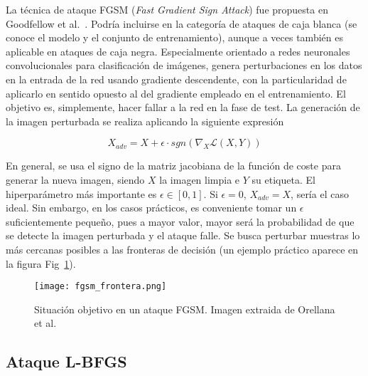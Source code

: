 La técnica de ataque FGSM (\textit{Fast Gradient Sign Attack}) fue propuesta en Goodfellow et al.~\cite{GoodfLAdvers}. Podría incluirse en la categoría de ataques de caja blanca (se conoce el modelo y el conjunto de entrenamiento), aunque a veces también es aplicable en ataques de caja negra. Especialmente orientado a redes neuronales convolucionales para clasificación de imágenes, genera perturbaciones en los datos en la entrada de la red usando gradiente descendente, con la particularidad de aplicarlo en sentido opuesto al del gradiente empleado en el entrenamiento. El objetivo es, simplemente, hacer fallar a la red en la fase de test. La generación de la imagen perturbada se realiza aplicando la siguiente expresión

$$X_{adv} = X + \epsilon \cdot sgn(\nabla_X \mathcal{L}(X,Y))$$

En general, se usa el signo de la matriz jacobiana de la función de coste para generar la nueva imagen, siendo $X$ la imagen limpia e $Y$ su etiqueta. El hiperparámetro más importante es $\epsilon \in [0,1]$. Si $\epsilon = 0$, $X_{adv}=X$, sería el caso ideal. Sin embargo, en los casos prácticos, es conveniente tomar un $\epsilon$ suficientemente pequeño, pues a mayor valor, mayor será la probabilidad de que se detecte la imagen perturbada y el ataque falle. Se busca perturbar muestras lo más cercanas posibles a las fronteras de decisión (un ejemplo práctico aparece en la figura Fig~\ref{fig:fgsm_frontera}).

\begin{figure}[h]
    \centering
    \texttt{[image: fgsm\_frontera.png]}
    \caption{Situación objetivo en un ataque FGSM. Imagen extraida de Orellana et al.~\cite{RodrigoTFM}}
    \label{fig:fgsm_frontera}
\end{figure}



\subsection*{Ataque L-BFGS}


